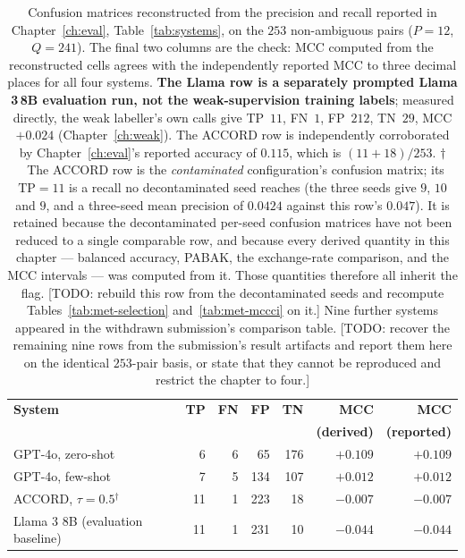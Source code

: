 \begin{table}[t]
\centering
\small
\begin{tabular}{lrrrrrr}
\toprule
\textbf{System} & \textbf{TP} & \textbf{FN} & \textbf{FP} & \textbf{TN} &
\textbf{MCC} & \textbf{MCC} \\
 & & & & & \textbf{(derived)} & \textbf{(reported)} \\
\midrule
GPT-4o, zero-shot          & 6  & 6 & 65  & 176 & $+0.109$ & $+0.109$ \\
GPT-4o, few-shot           & 7  & 5 & 134 & 107 & $+0.012$ & $+0.012$ \\
ACCORD, $\tau = 0.5$$^{\dagger}$ & 11 & 1 & 223 & 18  & $-0.007$ & $-0.007$ \\
Llama 3 8B (evaluation baseline) & 11 & 1 & 231 & 10  & $-0.044$ & $-0.044$ \\
\bottomrule
\end{tabular}
\caption{Confusion matrices reconstructed from the precision and recall reported
in Chapter~\ref{ch:eval}, Table~\ref{tab:systems}, on the $253$ non-ambiguous
pairs ($P = 12$, $Q = 241$). The final two columns are the check: MCC computed
from the reconstructed cells agrees with the independently reported MCC to three
decimal places for all four systems. \textbf{The Llama row is a separately
prompted Llama 3\,8B evaluation run, not the weak-supervision training
labels}; measured directly, the weak labeller's own calls give TP~$11$,
FN~$1$, FP~$212$, TN~$29$, MCC $+0.024$ (Chapter~\ref{ch:weak}). The ACCORD row is independently
corroborated by Chapter~\ref{ch:eval}'s reported accuracy of $0.115$, which is
$(11 + 18)/253$. $\dagger$~The ACCORD row is the \emph{contaminated}
configuration's confusion matrix; its $\mathrm{TP} = 11$ is a recall no
decontaminated seed reaches (the three seeds give $9$, $10$ and $9$, and a
three-seed mean precision of $0.0424$ against this row's $0.047$). It is retained
because the decontaminated per-seed confusion matrices have not been reduced to a
single comparable row, and because every derived quantity in this chapter ---
balanced accuracy, PABAK, the exchange-rate comparison, and the MCC intervals ---
was computed from it. Those quantities therefore all inherit the flag.
[TODO: rebuild this row from the decontaminated seeds and recompute
Tables~\ref{tab:met-selection} and~\ref{tab:met-mccci} on it.] Nine further
systems appeared in the withdrawn submission's
comparison table. [TODO: recover the remaining nine rows from the submission's
result artifacts and report them here on the identical $253$-pair basis, or
state that they cannot be reproduced and restrict the chapter to four.]}
\label{tab:met-confusion}
\end{table}

